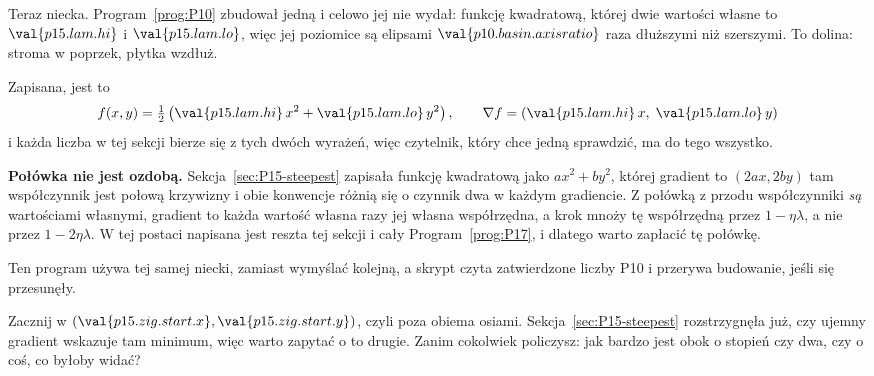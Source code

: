 \begin{fr}
Teraz niecka. Program~\ref{prog:P10} zbudował jedną i celowo jej nie wydał:
funkcję kwadratową, której dwie wartości własne to $\val{p15.lam.hi}$ i
$\val{p15.lam.lo}$, więc jej poziomice są elipsami
$\val{p10.basin.axisratio}$ raza dłuższymi niż szerszymi. To dolina: stroma w
poprzek, płytka wzdłuż.

Zapisana, jest to
\[ f(x, y) = \tfrac{1}{2}\left(\val{p15.lam.hi}\,x^{2}
   + \val{p15.lam.lo}\,y^{2}\right),
   \qquad
   \nabla f = (\val{p15.lam.hi}\,x,\; \val{p15.lam.lo}\,y) \]
i każda liczba w tej sekcji bierze się z tych dwóch wyrażeń, więc czytelnik,
który chce jedną sprawdzić, ma do tego wszystko.

\textbf{Połówka nie jest ozdobą.} Sekcja~\ref{sec:P15-steepest} zapisała
funkcję kwadratową jako $ax^{2} + by^{2}$, której gradient to $(2ax, 2by)$
\dash{} tam współczynnik jest połową krzywizny i obie konwencje różnią się o
czynnik dwa w każdym gradiencie. Z połówką z przodu współczynniki
\emph{są} wartościami własnymi, gradient to każda wartość własna razy jej
własna współrzędna, a krok mnoży tę współrzędną przez $1 - \eta\lambda$, a nie
przez $1 - 2\eta\lambda$. W tej postaci napisana jest reszta tej sekcji i cały
Program~\ref{prog:P17}, i dlatego warto zapłacić tę połówkę.

Ten program używa tej samej niecki, zamiast wymyślać kolejną, a skrypt czyta
zatwierdzone liczby P10 i przerywa budowanie, jeśli się przesunęły.

Zacznij w $(\val{p15.zig.start.x}, \val{p15.zig.start.y})$, czyli poza obiema
osiami. Sekcja~\ref{sec:P15-steepest} rozstrzygnęła już, czy ujemny gradient
wskazuje tam minimum, więc warto zapytać o to drugie. Zanim cokolwiek
policzysz: jak bardzo jest obok \dash{} o stopień czy dwa, czy o coś, co
byłoby widać?
\nextframe
\end{fr}

